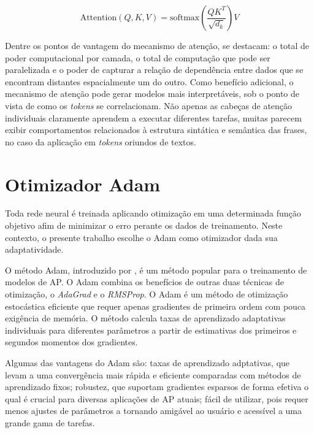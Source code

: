 \begin{equation}
\text{Attention}(Q, K, V) = \text{softmax}\left(\frac{QK^T}{\sqrt{d_k}}\right)V
\label{eq:attention}
\end{equation}

Dentre os pontos de vantagem do mecanismo de atenção, se destacam: o total de poder computacional por camada, o total de computação que pode ser paralelizada e o poder de capturar a relação de dependência entre dados que se encontram distantes espacialmente um do outro. Como benefício adicional, o mecanismo de atenção pode gerar modelos mais interpretáveis, sob o ponto de vista de como os \textit{tokens} se correlacionam. Não apenas as cabeças de atenção individuais claramente aprendem a executar diferentes tarefas, muitas parecem exibir comportamentos relacionados à estrutura sintática e semântica das frases, no caso da aplicação em \textit{tokens} oriundos de textos.

\section{Otimizador Adam}
\label{sec:adam}

Toda rede neural é treinada aplicando otimização em uma determinada função objetivo afim de minimizar o erro perante os dados de treinamento. Neste contexto, o presente trabalho escolhe o \gls{Adam} como otimizador dada sua adaptatividade.

O método \gls{Adam}, introduzido por , é um método popular para o treinamento de modelos de \gls{AP}. O \gls{Adam} combina os benefícios de outras duas técnicas de otimização, o \textit{AdaGrad} e o \textit{RMSProp}. O \gls{Adam} é um método de otimização estocástica eficiente que requer apenas gradientes de primeira ordem com pouca exigência de memória. O método calcula taxas de aprendizado adaptativas individuais para diferentes parâmetros a partir de estimativas dos primeiros e segundos momentos dos gradientes.

Algumas das vantagens do \gls{Adam} são: taxas de aprendizado adptativas, que levam a uma convergência mais rápida e eficiente comparadas com métodos de aprendizado fixos; robustez, que suportam gradientes esparsos de forma efetiva o qual é crucial para diversas aplicações de \gls{AP} atuais; fácil de utilizar, pois requer menos ajustes de parâmetros a tornando amigável ao usuário e acessível a uma grande gama de tarefas.


